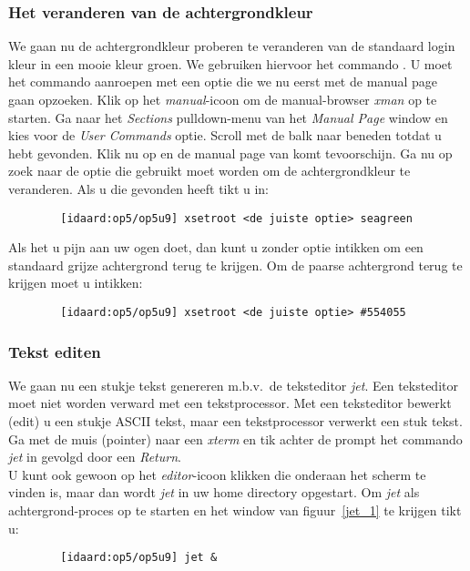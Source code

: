 \subsubsection{Het veranderen van de achtergrondkleur}
\label{Het veranderen van de achtergrondkleur}

We gaan nu de achtergrondkleur proberen te veranderen van
de standaard login kleur in een mooie kleur groen.
We gebruiken hiervoor het commando .
U moet het commando  aanroepen met een optie
die we nu eerst met de manual page gaan opzoeken.
Klik op het {\em manual}-icoon om de manual-browser {\em xman} op te starten.
Ga naar het {\em Sections} pulldown-menu van het {\em Manual Page}
window en kies voor de {\em User Commands} optie.
Scroll met de balk naar beneden totdat u  hebt gevonden.
Klik nu op  en de manual page van  komt
tevoorschijn.
Ga nu op zoek naar de optie die gebruikt moet worden om
de achtergrondkleur te veranderen.
Als u die gevonden heeft tikt u in:
\begin{verbatim}
        [idaard:op5/op5u9] xsetroot <de juiste optie> seagreen
\end{verbatim}
Als het u pijn aan uw ogen doet,
dan kunt u  zonder optie intikken
om een standaard grijze achtergrond terug te krijgen.
Om de paarse achtergrond terug te krijgen moet u intikken:
\begin{verbatim}
        [idaard:op5/op5u9] xsetroot <de juiste optie> #554055
\end{verbatim}

\subsubsection{Tekst editen}
\label{Tekst editen}
We gaan nu een stukje tekst genereren 
m.b.v.\ de teksteditor {\em jet}.
Een teksteditor moet niet worden verward met een tekstprocessor.
Met een teksteditor bewerkt (edit) u een stukje ASCII tekst,
maar een tekstprocessor verwerkt een stuk tekst.
Ga met de muis (pointer) naar een {\em xterm} en
tik achter de prompt het commando {\em jet} in
gevolgd door een {\em Return}.\\
U kunt ook gewoon op het {\em editor}-icoon klikken
die onderaan het scherm te vinden is,
maar dan wordt {\em jet} in uw home directory opgestart.
Om {\em jet} als achtergrond-proces op te starten en
het window van figuur~\ref{jet_1} te krijgen tikt u:
\begin{verbatim}
        [idaard:op5/op5u9] jet &
\end{verbatim}

